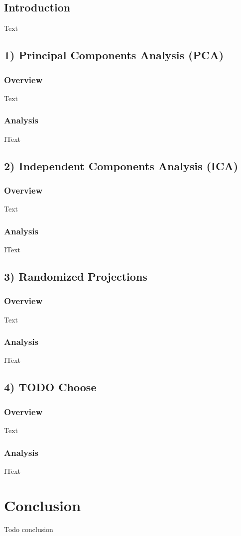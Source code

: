 \documentclass[h]{article}
\begin{document}
\subsection*{ Introduction}  
Text

\subsection*{1) Principal Components Analysis (PCA)}  
\subsubsection*{Overview}
Text

\subsubsection*{Analysis}
IText

\subsection*{2) Independent Components Analysis (ICA)}  
\subsubsection*{Overview}
Text

\subsubsection*{Analysis}
IText

\subsection*{3) Randomized Projections}  
\subsubsection*{Overview}
Text

\subsubsection*{Analysis}
IText

\subsection*{4) TODO Choose}  
\subsubsection*{Overview}
Text

\subsubsection*{Analysis}
IText


\section*{Conclusion}  
Todo conclusion
\end{document}
